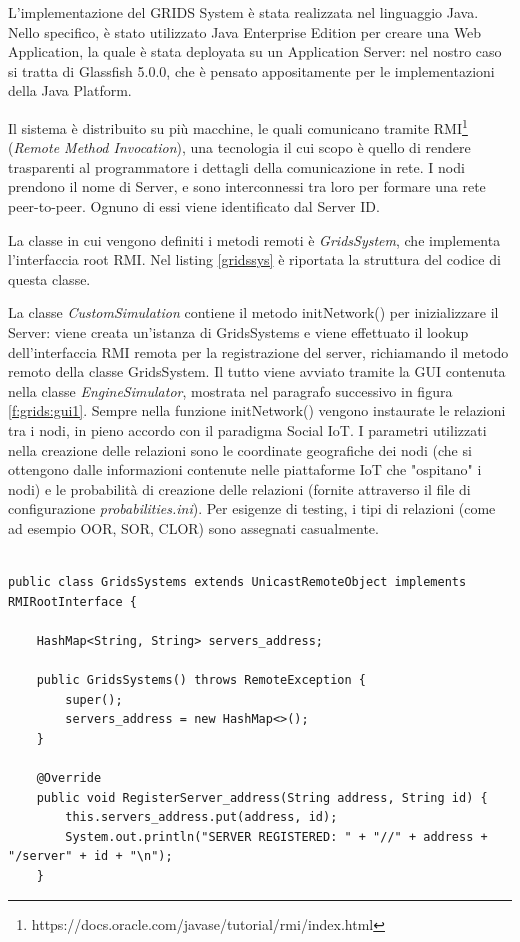 L'implementazione del GRIDS System è stata realizzata nel linguaggio Java. Nello specifico, è stato utilizzato Java Enterprise Edition per creare una Web Application, la quale è stata deployata su un Application Server: nel nostro caso si tratta di Glassfish 5.0.0, che è pensato appositamente per le implementazioni della Java Platform.

Il sistema è distribuito su più macchine, le quali comunicano tramite RMI\footnote{https://docs.oracle.com/javase/tutorial/rmi/index.html} (\textit{Remote Method Invocation}), una tecnologia il cui scopo è quello di rendere trasparenti al programmatore i dettagli della comunicazione in rete. I nodi prendono il nome di Server, e sono interconnessi tra loro per formare una rete peer-to-peer. Ognuno di essi viene identificato dal Server ID.

La classe in cui vengono definiti i metodi remoti è \textit{GridsSystem}, che implementa l'interfaccia root RMI. Nel listing \ref{gridssys} è riportata la struttura del codice di questa classe.

La classe \textit{CustomSimulation} contiene il metodo initNetwork() per inizializzare il Server: viene creata un'istanza di GridsSystems e viene effettuato il lookup dell'interfaccia RMI remota per la registrazione del server, richiamando il metodo remoto della classe GridsSystem. Il tutto viene avviato tramite la GUI contenuta nella classe \textit{EngineSimulator}, mostrata nel paragrafo successivo in figura \ref{f:grids:gui1}.
Sempre nella funzione initNetwork() vengono instaurate le relazioni tra i nodi, in pieno accordo con il paradigma Social IoT. I parametri utilizzati nella creazione delle relazioni sono le coordinate geografiche dei nodi (che si ottengono dalle informazioni contenute nelle piattaforme IoT che "ospitano" i nodi) e le probabilità di creazione delle relazioni (fornite attraverso il file di configurazione \textit{probabilities.ini}). Per esigenze di testing, i tipi di relazioni (come ad esempio OOR, SOR, CLOR) sono assegnati casualmente.

\begin{lstlisting}[caption={GridsSystem.java},label={gridssys},style={c}]

public class GridsSystems extends UnicastRemoteObject implements RMIRootInterface {

    HashMap<String, String> servers_address;

    public GridsSystems() throws RemoteException {
        super();
        servers_address = new HashMap<>();
    }

    @Override
    public void RegisterServer_address(String address, String id) {
        this.servers_address.put(address, id);
        System.out.println("SERVER REGISTERED: " + "//" + address + "/server" + id + "\n");
    }
\end{lstlisting}

